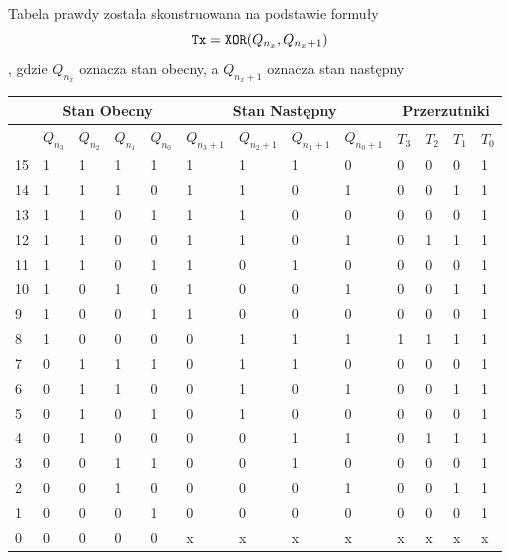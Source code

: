 \documentclass[a4paper]{article}
\begin{document}
Tabela prawdy została skonstruowana na podstawie formuły 
\[\verb|Tx| =  \verb|XOR|(Q_{n_x},  Q_{n_x+1})\],
gdzie $Q_{n_x}$ oznacza stan obecny, a $Q_{n_x+1}$ oznacza stan następny
\begin{center}
    \begin{tabular}{|l|l|l|l|l||l|l|l|l||l|l|l|l|}
    \hline
    &\multicolumn{4}{c||}{Stan Obecny} & \multicolumn{4}{|c||}{Stan Następny} & \multicolumn{4}{|c|}{Przerzutniki} \\\hline
       &$Q_{n_3}$ & $Q_{n_2}$ & $Q_{n_1}$ & $Q_{n_0}$ & $Q_{n_3+1}$ & $Q_{n_2+1}$ & $Q_{n_1+1}$ &$Q_{n_0+1}$ & $T_3$ & $T_2$ & $T_1$ & $T_0$ \\ \hline
    15 & 1 & 1 & 1 & 1 & 1 & 1 & 1 & 0 & 0 & 0 & 0 & 1 \\ \hline
    14 & 1 & 1 & 1 & 0 & 1 & 1 & 0 & 1 & 0 & 0 & 1 & 1 \\ \hline
    13 & 1 & 1 & 0 & 1 & 1 & 1 & 0 & 0 & 0 & 0 & 0 & 1 \\ \hline
    12 & 1 & 1 & 0 & 0 & 1 & 1 & 0 & 1 & 0 & 1 & 1 & 1 \\ \hline
    11 & 1 & 1 & 0 & 1 & 1 & 0 & 1 & 0 & 0 & 0 & 0 & 1 \\ \hline
    10 & 1 & 0 & 1 & 0 & 1 & 0 & 0 & 1 & 0 & 0 & 1 & 1 \\ \hline
    9  & 1 & 0 & 0 & 1 & 1 & 0 & 0 & 0 & 0 & 0 & 0 & 1 \\ \hline
    8  & 1 & 0 & 0 & 0 & 0 & 1 & 1 & 1 & 1 & 1 & 1 & 1 \\ \hline
    7  & 0 & 1 & 1 & 1 & 0 & 1 & 1 & 0 & 0 & 0 & 0 & 1 \\ \hline
    6  & 0 & 1 & 1 & 0 & 0 & 1 & 0 & 1 & 0 & 0 & 1 & 1 \\ \hline
    5  & 0 & 1 & 0 & 1 & 0 & 1 & 0 & 0 & 0 & 0 & 0 & 1 \\ \hline
    4  & 0 & 1 & 0 & 0 & 0 & 0 & 1 & 1 & 0 & 1 & 1 & 1 \\ \hline
    3  & 0 & 0 & 1 & 1 & 0 & 0 & 1 & 0 & 0 & 0 & 0 & 1 \\ \hline
    2  & 0 & 0 & 1 & 0 & 0 & 0 & 0 & 1 & 0 & 0 & 1 & 1 \\ \hline
    1  & 0 & 0 & 0 & 1 & 0 & 0 & 0 & 0 & 0 & 0 & 0 & 1 \\ \hline
    0  & 0 & 0 & 0 & 0 & x & x & x & x & x & x & x & x \\ \hline
    \end{tabular}
    \end{center}
\end{document}

